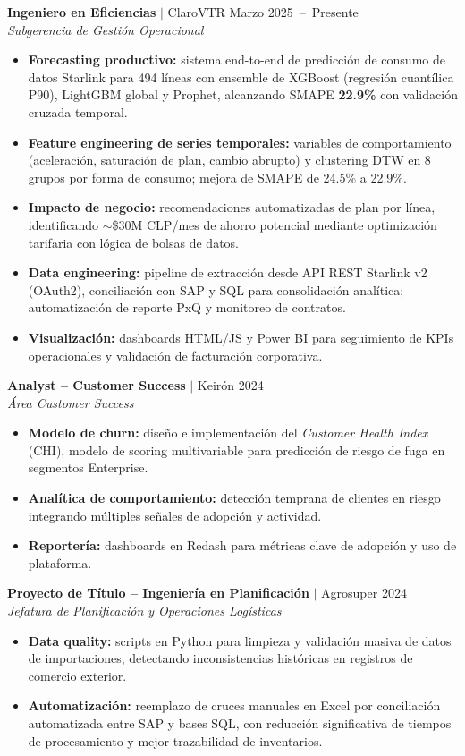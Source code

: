 \documentclass[a4paper,10pt]{article}
\newcommand{\entryspace}{\vspace{0.12cm}}
\begin{document}
\noindent\textbf{Ingeniero en Eficiencias} $|$ ClaroVTR \hfill Marzo 2025~--~Presente \\
\textit{Subgerencia de Gestión Operacional}
\begin{itemize}
    \item \textbf{Forecasting productivo:} sistema end-to-end de predicción de consumo de datos Starlink para 494 líneas con ensemble de XGBoost (regresión cuantílica P90), LightGBM global y Prophet, alcanzando SMAPE \textbf{22.9\%} con validación cruzada temporal.
    \item \textbf{Feature engineering de series temporales:} variables de comportamiento (aceleración, saturación de plan, cambio abrupto) y clustering DTW en 8 grupos por forma de consumo; mejora de SMAPE de 24.5\% a 22.9\%.
    \item \textbf{Impacto de negocio:} recomendaciones automatizadas de plan por línea, identificando $\sim$\$30M CLP/mes de ahorro potencial mediante optimización tarifaria con lógica de bolsas de datos.
    \item \textbf{Data engineering:} pipeline de extracción desde API REST Starlink v2 (OAuth2), conciliación con SAP y SQL para consolidación analítica; automatización de reporte PxQ y monitoreo de contratos.
    \item \textbf{Visualización:} dashboards HTML/JS y Power BI para seguimiento de KPIs operacionales y validación de facturación corporativa.
\end{itemize}
\entryspace

\noindent\textbf{Analyst -- Customer Success} $|$ Keirón \hfill 2024 \\
\textit{Área Customer Success}
\begin{itemize}
    \item \textbf{Modelo de churn:} diseño e implementación del \textit{Customer Health Index} (CHI), modelo de scoring multivariable para predicción de riesgo de fuga en segmentos Enterprise.
    \item \textbf{Analítica de comportamiento:} detección temprana de clientes en riesgo integrando múltiples señales de adopción y actividad.
    \item \textbf{Reportería:} dashboards en Redash para métricas clave de adopción y uso de plataforma.
\end{itemize}
\entryspace

\noindent\textbf{Proyecto de Título -- Ingeniería en Planificación} $|$ Agrosuper \hfill 2024 \\
\textit{Jefatura de Planificación y Operaciones Logísticas}
\begin{itemize}
    \item \textbf{Data quality:} scripts en Python para limpieza y validación masiva de datos de importaciones, detectando inconsistencias históricas en registros de comercio exterior.
    \item \textbf{Automatización:} reemplazo de cruces manuales en Excel por conciliación automatizada entre SAP y bases SQL, con reducción significativa de tiempos de procesamiento y mejor trazabilidad de inventarios.
\end{itemize}
\entryspace
\end{document}
